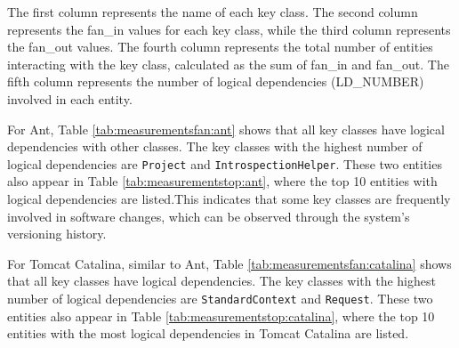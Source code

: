 The first column represents the name of each key class. The second column represents the fan\_in values for each key class, while the third column represents the fan\_out values. The fourth column represents the total number of entities interacting with the key class, calculated as the sum of fan\_in and fan\_out. The fifth column represents the number of logical dependencies (LD\_NUMBER) involved in each entity.

For Ant, Table \ref{tab:measurementsfan:ant} shows that all key classes have logical dependencies with other classes. The key classes with the highest number of logical dependencies are \texttt{Project} and \texttt{IntrospectionHelper}. These two entities also appear in Table \ref{tab:measurementstop:ant}, where the top 10 entities with logical dependencies are listed.This indicates that some key classes are frequently involved in software changes, which can be observed through the system’s versioning history.


\begin{table}[!h]
\renewcommand{\arraystretch}{1}
\caption{Measurements for Ant key classes}
\label{tab:measurementsfan:ant}
\centering
{}
\end{table}


For Tomcat Catalina, similar to Ant, Table \ref{tab:measurementsfan:catalina} shows that all key classes have logical dependencies. The key classes with the highest number of logical dependencies are \texttt{StandardContext} and \texttt{Request}. These two entities also appear in Table \ref{tab:measurementstop:catalina}, where the top 10 entities with the most logical dependencies in Tomcat Catalina are listed.


